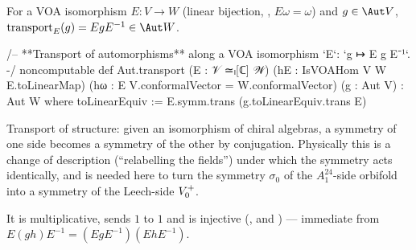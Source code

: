 \begin{definition}\label{ch11:def:transport}
For a VOA isomorphism $E:V\to W$ (linear bijection, , $E\omega=\omega$) and $g\in\Aut V$,
$\mathrm{transport}_E(g)=EgE^{-1}\in\Aut W$.
\end{definition}
\begin{leancode}
/-- **Transport of automorphisms** along a VOA isomorphism `E`: `g ↦ E g E⁻¹`. -/
noncomputable def Aut.transport (E : 𝒱 ≃ₗ[ℂ] 𝒲) (hE : IsVOAHom V W E.toLinearMap)
    (hω : E V.conformalVector = W.conformalVector) (g : Aut V) : Aut W where
  toLinearEquiv := E.symm.trans (g.toLinearEquiv.trans E)
\end{leancode}

\begin{physics}
Transport of structure: given an isomorphism of chiral algebras, a symmetry of one side becomes a symmetry of the other by conjugation. Physically this is a change of description (``relabelling the fields'') under which the symmetry acts identically, and is needed here to turn the symmetry $\sigma_0$ of the $A_1^{24}$-side orbifold into a symmetry of the Leech-side $V_0^{+}$.
\end{physics}
It is multiplicative, sends $1$ to $1$ and is injective (,  and
) --- immediate from $E(gh)E^{-1}=
(EgE^{-1})(EhE^{-1})$.

